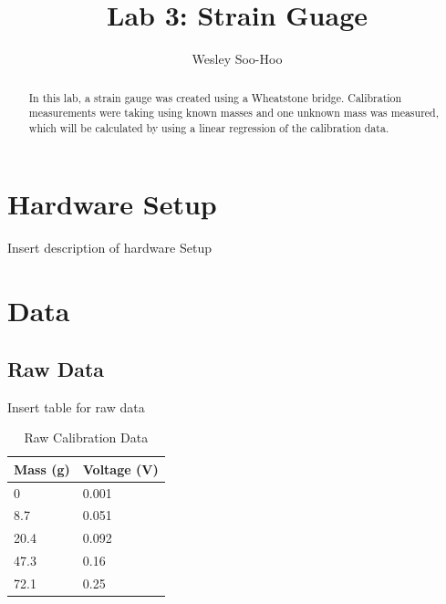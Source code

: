 \documentclass[11pt]{article}
\begin{document}
\title{Lab 3: Strain Guage}
\author{Wesley Soo-Hoo}
\maketitle

\begin{abstract}
    In this lab, a strain gauge was created using a Wheatstone bridge. Calibration measurements were taking using known masses and one unknown mass was measured, which will be calculated by using a linear regression of the calibration data.
\end{abstract}

\section{Hardware Setup}
Insert description of hardware Setup

\section{Data}
\subsection{Raw Data}
Insert table for raw data

\begin{table}[!ht]
	
	\small                      %
	\centering                  %
	\caption{Raw Calibration Data} %
	\label{tab:ninjahours}      %
	
\begin{tabular}{m{1in}|m{1in}}
\textbf{Mass (g)}&	\textbf{Voltage (V)}\\ \hline
0&		0.001 \\
8.7&	0.051 \\
20.4&	0.092 \\
47.3&	0.16  \\
72.1&	0.25  \\
\end{tabular}

\end{table}
\end{document}

